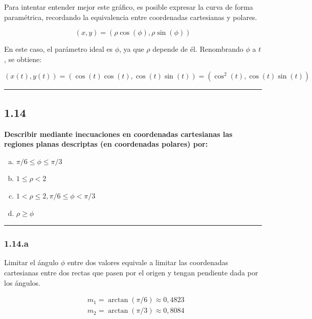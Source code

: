 \documentclass{article}
\begin{document}
Para intentar entender mejor este gráfico, es posible expresar la curva de forma paramétrica, recordando la equivalencia entre coordenadas cartesianas y polares.

\begin{equation}
(x, y) = (\rho \cos(\phi), \rho \sin(\phi))
\end{equation}

En este caso, el parámetro ideal es $\phi$, ya que $\rho$ depende de él. Renombrando $\phi$ a $t$, se obtiene:

\begin{equation}
(x(t), y(t)) = (\cos(t) \cos(t), \cos(t)\sin(t)) = (\cos^2(t), \cos(t) \sin(t))
\end{equation}

\hrule
\vspace{10 pt}

\subsection*{1.14}
\label{subsec:1.14}

\textbf{Describir mediante inecuaciones en coordenadas cartesianas las regiones planas descriptas (en coordenadas polares) por:}

\begin{enumerate}[(a)]
\bfseries
\item $\pi/6 \leq \phi \leq \pi/3$

\item $1 \leq \rho < 2$

\item $1 < \rho \leq 2, \pi/6 \leq \phi < \pi/3$

\item $\rho \geq \phi$
\end{enumerate}
\hrule

\subsubsection*{1.14.a}
\label{subsubsec:1.14.a}

Limitar el ángulo $\phi$ entre dos valores equivale a limitar las coordenadas cartesianas entre dos rectas que pasen por el origen y tengan pendiente dada por los ángulos.

\begin{subequations}
\begin{align}
& m_1 = \arctan(\pi/6) \approx 0,4823 \\
& m_2 = \arctan(\pi/3) \approx 0,8084
\end{align}
\end{subequations}
\end{document}
